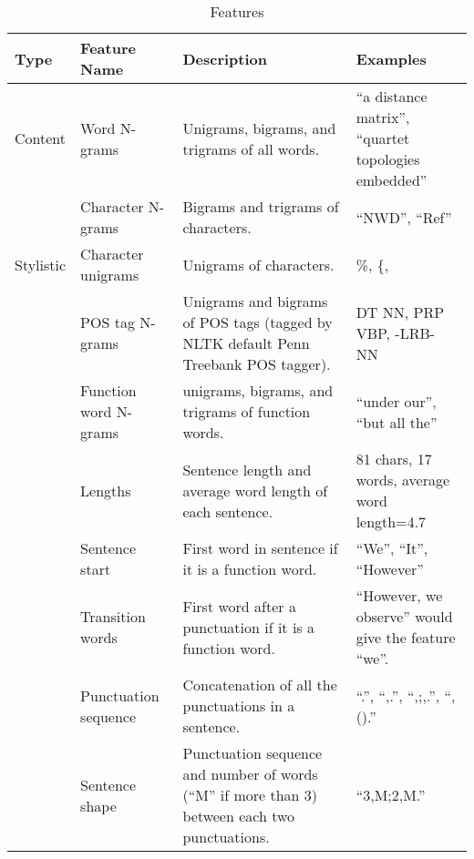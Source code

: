 \begin{table*}[t]
\begin{center}
\small
\bgroup
\def\arraystretch{1.5}
\begin{tabular}{l p{3.5cm} p{5cm} p{4cm}}
 \hline
\textbf{Type} & \textbf{Feature Name} & \textbf{Description} & \textbf{Examples} \\ 
\hline
Content   & Word N-grams       & Unigrams, bigrams, and trigrams of all words.        & ``a distance matrix'', ``quartet topologies embedded''   \\
          & Character N-grams  & Bigrams and trigrams of characters.                  & ``NWD'', ``Ref''                  \\
\hline
Stylistic & Character unigrams & Unigrams of characters.                             & \%, \{, ~                           \\
          & POS tag N-grams    & Unigrams and bigrams of POS tags (tagged by NLTK default Penn Treebank POS tagger). &  DT NN, PRP VBP, -LRB- NN \\
          & Function word N-grams & unigrams, bigrams, and trigrams of function words.  & ``under our'', ``but all the''    \\
          & Lengths            & Sentence length and average word length of each sentence. & 81 chars, 17 words, average word length=4.7 \\
          & Sentence start     & First word in sentence if it is a function word.    & ``We'', ``It'', ``However''       \\
          & Transition words   & First word after a punctuation if it is a function word. & ``However, we observe'' would give the feature ``we''.\\
          & Punctuation sequence & Concatenation of all the punctuations in a sentence. & ``.'', ``,.'', ``,;,.'', ``,().'' \\
          & Sentence shape     & Punctuation sequence and number of words (``M'' if more than 3) between each two punctuations. & ``3,M;2,M.'' \\
\hline
\end{tabular}
\egroup
\end{center}
\caption{Features}
\label{table:features}
\end{table*}


